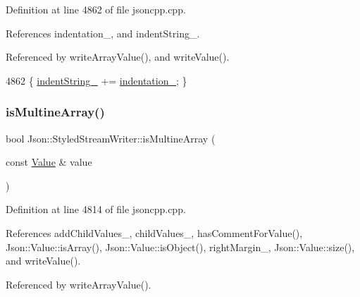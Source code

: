 Definition at line 4862 of file jsoncpp.\+cpp.



References indentation\+\_\+, and indent\+String\+\_\+.



Referenced by write\+Array\+Value(), and write\+Value().


\begin{DoxyCode}
4862 \{ \hyperlink{class_json_1_1_styled_stream_writer_a1481433ebe1491ea83b0beb92aed56c2}{indentString\_} += \hyperlink{class_json_1_1_styled_stream_writer_aa45d8fb4ca82d0550be9042012303713}{indentation\_}; \}
\end{DoxyCode}
\mbox{\label{class_json_1_1_styled_stream_writer_a88f4d342cf25c73aabf77c1b8ba01e44}} 
\subsubsection{\texorpdfstring{is\+Multine\+Array()}{isMultineArray()}}
{\footnotesize\ttfamily bool Json\+::\+Styled\+Stream\+Writer\+::is\+Multine\+Array (\begin{DoxyParamCaption}\item[{const \hyperlink{class_json_1_1_value}{Value} \&}]{value }\end{DoxyParamCaption})\hspace{0.3cm}{\ttfamily [private]}}



Definition at line 4814 of file jsoncpp.\+cpp.



References add\+Child\+Values\+\_\+, child\+Values\+\_\+, has\+Comment\+For\+Value(), Json\+::\+Value\+::is\+Array(), Json\+::\+Value\+::is\+Object(), right\+Margin\+\_\+, Json\+::\+Value\+::size(), and write\+Value().



Referenced by write\+Array\+Value().



